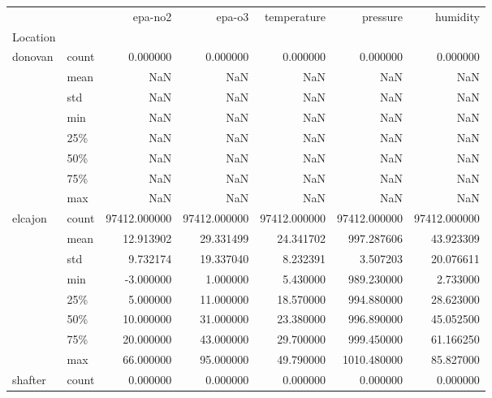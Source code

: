 \begin{tabular}{llrrrrr}
\toprule
        &       &       epa-no2 &        epa-o3 &   temperature &      pressure &      humidity \\
Location & {} &               &               &               &               &               \\
\midrule
donovan & count &      0.000000 &      0.000000 &      0.000000 &      0.000000 &      0.000000 \\
        & mean &           NaN &           NaN &           NaN &           NaN &           NaN \\
        & std &           NaN &           NaN &           NaN &           NaN &           NaN \\
        & min &           NaN &           NaN &           NaN &           NaN &           NaN \\
        & 25\% &           NaN &           NaN &           NaN &           NaN &           NaN \\
        & 50\% &           NaN &           NaN &           NaN &           NaN &           NaN \\
        & 75\% &           NaN &           NaN &           NaN &           NaN &           NaN \\
        & max &           NaN &           NaN &           NaN &           NaN &           NaN \\
elcajon & count &  97412.000000 &  97412.000000 &  97412.000000 &  97412.000000 &  97412.000000 \\
        & mean &     12.913902 &     29.331499 &     24.341702 &    997.287606 &     43.923309 \\
        & std &      9.732174 &     19.337040 &      8.232391 &      3.507203 &     20.076611 \\
        & min &     -3.000000 &      1.000000 &      5.430000 &    989.230000 &      2.733000 \\
        & 25\% &      5.000000 &     11.000000 &     18.570000 &    994.880000 &     28.623000 \\
        & 50\% &     10.000000 &     31.000000 &     23.380000 &    996.890000 &     45.052500 \\
        & 75\% &     20.000000 &     43.000000 &     29.700000 &    999.450000 &     61.166250 \\
        & max &     66.000000 &     95.000000 &     49.790000 &   1010.480000 &     85.827000 \\
shafter & count &      0.000000 &      0.000000 &      0.000000 &      0.000000 &      0.000000 \\

\end{tabular}
